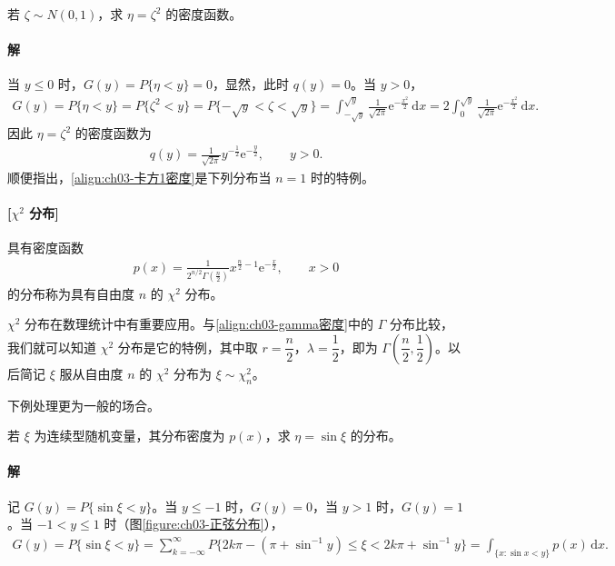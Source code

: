 \documentclass[../../main.tex]{subfiles}
\begin{document}
\begin{example}[平方变换]\label{example:ch03-平方变换}
若 $\zeta\sim N(0,1)$，求 $\eta=\zeta^{2}$ 的密度函数。

\paragraph*{解}当 $y\leqslant 0$ 时，$G(y)=P\{\eta<y\}=0$，显然，此时 $q(y)=0$。当 $y>0$，
\begin{align*}
G(y)=P\{\eta<y\}=P\{\zeta^{2}<y\}=P\{-\sqrt{y}<\zeta<\sqrt{y}\}
=\int_{-\sqrt{y}}^{\sqrt{y}}\frac{1}{\sqrt{2\pi}}\mathrm{e}^{-\frac{x^{2}}{2}}\,\mathrm{d}x
=2\int_{0}^{\sqrt{y}}\frac{1}{\sqrt{2\pi}}\mathrm{e}^{-\frac{x^{2}}{2}}\,\mathrm{d}x.
\end{align*}
因此 $\eta=\zeta^{2}$ 的密度函数为
\begin{align}
q(y)=\frac{1}{\sqrt{2\pi}}y^{-\frac{1}{2}}\mathrm{e}^{-\frac{y}{2}},\qquad y>0.\label{align:ch03-卡方1密度}
\end{align}
顺便指出，\eqref{align:ch03-卡方1密度}是下列分布当 $n=1$ 时的特例。

\paragraph{[$\chi^{2}$ 分布]}具有密度函数
\begin{align}
p(x)=\frac{1}{2^{n/2}\Gamma\!\left(\frac{n}{2}\right)}x^{\frac{n}{2}-1}\mathrm{e}^{-\frac{x}{2}},\qquad x>0\label{align:ch03-卡方密度}
\end{align}
的分布称为具有自由度 $n$ 的 $\chi^{2}$ 分布。

$\chi^{2}$ 分布在数理统计中有重要应用。与\eqref{align:ch03-gamma密度}中的 $\Gamma$ 分布比较，我们就可以知道 $\chi^{2}$ 分布是它的特例，其中取 $r=\dfrac{n}{2}$，$\lambda=\dfrac{1}{2}$，即为 $\Gamma\!\left(\dfrac{n}{2},\dfrac{1}{2}\right)$。以后简记 $\xi$ 服从自由度 $n$ 的 $\chi^{2}$ 分布为 $\xi\sim\chi_n^{2}$。
\end{example}

下例处理更为一般的场合。

\begin{example}[正弦变换]\label{example:ch03-正弦变换}
若 $\xi$ 为连续型随机变量，其分布密度为 $p(x)$，求 $\eta=\sin\xi$ 的分布。

\paragraph*{解}记 $G(y)=P\{\sin\xi<y\}$。当 $y\leqslant -1$ 时，$G(y)=0$，当 $y>1$ 时，$G(y)=1$。当 $-1<y\leqslant 1$ 时（图\ref{figure:ch03-正弦分布}），
\begin{align*}
G(y)=P\{\sin\xi<y\}=\sum_{k=-\infty}^{\infty}P\{2k\pi-(\pi+\sin^{-1}y)\leqslant\xi<2k\pi+\sin^{-1}y\}
=\int_{\{x:\sin x<y\}}p(x)\,\mathrm{d}x.
\end{align*}
\end{example}
\end{document}
